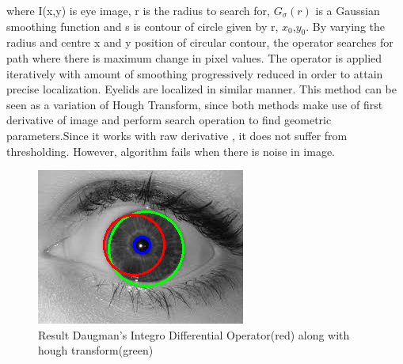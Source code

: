 \documentclass[conference]{Iris_detect}
\begin{document}
\begin{itemize}
   where I(x,y) is eye image, r is the radius to search for, $G_{\sigma}(r)$ is a Gaussian smoothing function and s is contour of circle given by r, $x_{0}$,$y_{0}$. By varying the radius and centre x and y position of circular contour, the operator searches for path where there is maximum change in pixel values. The operator is applied iteratively with amount of smoothing progressively reduced in order to attain precise localization. Eyelids are localized in similar manner.
   This method can be seen as a variation of Hough Transform, since both methods make use of first derivative of image and perform search operation to find geometric parameters.Since it works with raw derivative , it does not suffer from thresholding. However, algorithm fails when there is noise in image.
\end{itemize}
\begin{figure}
\includegraphics{Images/daugman_method_screenshot.png}
\caption{Result Daugman's Integro Differential Operator(red) along with hough transform(green)}
\end{figure}
\end{document}
